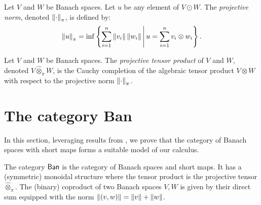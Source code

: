 
\begin{definition} \cite[Chapter 2.1]{ryanIntroductionTensorProducts2013}
  Let $V$ and $W$ be Banach spaces. Let $u$ be any element of $V \odot W$. The \emph{projective norm}, denoted $\left\lVert  \cdot  \right\rVert_{\pi}$,  is defined by: 
  \[
 \left\lVert u \right\rVert_{\pi} = \inf\left\{ \sum_{i=1}^n \left\lVert v_i \right\rVert \left\lVert w_i \right\rVert \Bigg| \, u = \sum_{i=1}^n v_i \otimes w_i\right\}.
\]
\end{definition}


\begin{definition} \cite[Chapter 2.1]{ryanIntroductionTensorProducts2013}
  Let \( V \) and \( W \) be Banach spaces. The \emph{projective tensor product} of \( V \) and \( W \), denoted  $ V \widehat{\otimes}_\pi W$, is the Cauchy  completion of the algebraic tensor product \( V \otimes W \) with respect to the projective norm \( \left\lVert \cdot \right\rVert_{\pi} \).
\end{definition}







\section{The category Ban}

In this section, leveraging results from \cite{dahlqvist2023syntactic}, we prove that the category of Banach spaces with short maps forms a suitable model of our calculus.

\begin{comment}
\begin{definition}
Let \( x = (x_1, x_2, \dots, x_n) \in \mathbb{C}^n \). The \( L^1 \) norm, \gls{l1_norm},  is defined by
\[
\|x\|_{L^1} = \sum_{i=1}^n |x_i|.
\]
\end{definition}
\end{comment}

\begin{definition}
  The category $\mathsf{Ban}$ is the category of Banach spaces and short maps. It has a (symmetric) monoidal structure  where the tensor product is the projective tensor $\widehat{\otimes}_\pi$.
  The (binary) coproduct of two Banach spaces $V,W$ is given by their direct sum equipped with the norm $\left\lVert (v,w) \right\rVert = \left\lVert v \right\rVert + \left\lVert w \right\rVert$.  
\end{definition}



